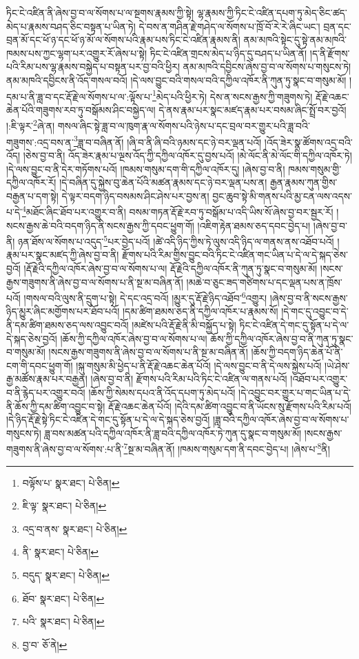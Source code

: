 ཏིང་ངེ་འཛིན་ནི་ཞེས་བྱ་བ་ལ་སོགས་པ་ལ་སྔགས་རྣམས་ཀྱི་སྟེ། ལྷ་རྣམས་ཀྱི་ཏིང་ངེ་འཛིན་དཔག་ཏུ་མེད་ཅིང་ཚད་མེད་པ་རྣམས་བཤད་ཅིང་བསྟན་པ་ཡིན་ཏེ། དེ་བས་ན་གཤིན་རྗེ་གཤེད་ལ་སོགས་པ་ཁྲོ་བོ་རེ་རེ་ཞིང་ཡང་། བྲན་དང་བྲན་མོ་དང་ཕོ་ཉ་དང་ཕོ་ཉ་མོ་ལ་སོགས་པའི་རྣམ་པས་ཏིང་ངེ་འཛིན་རྣམས་ནི། ནམ་མཁའི་སྟེང་དུ་སྟེ་ནམ་མཁའི་ཁམས་པས་ཀྱང་ལྷག་པར་འགྱུར་རོ་ཞེས་པ་སྟེ། ཏིང་ངེ་འཛིན་གྲངས་མེད་པ་ཉིད་དུ་བཤད་པ་ཡིན་ནོ། །ད་ནི་རྫོགས་པའི་རིམ་པས་ལྷ་རྣམས་བསྐྱེད་པ་བསྟན་པར་བྱ་བའི་ཕྱིར། ནམ་མཁའི་དབྱིངས་ཞེས་བྱ་བ་ལ་སོགས་པ་གསུངས་ཏེ། ནམ་མཁའི་དབྱིངས་ནི་འོད་གསལ་བའོ། །དེ་ལས་བྱུང་བའི་གསལ་བའི་དཀྱིལ་འཁོར་ནི་ཀུན་ཏུ་སྣང་བ་གསུམ་མོ། །དམ་པ་ནི་ཟླ་བ་དང་རྡོ་རྗེ་ལ་སོགས་པ་ལ་:ལྟོས་པ་\footnote{བལྟོས་པ་  སྣར་ཐང་།  པེ་ཅིན། }མེད་པའི་ཕྱིར་ཏེ། དེས་ན་སངས་རྒྱས་ཀྱི་གཟུགས་ཏེ། རྡོ་རྗེ་འཆང་ཆེན་པོའི་གཟུགས་རབ་ཏུ་བསྒོམས་ཤིང་བསྐྱེད་ལ། དེ་ནས་རྣམ་པར་སྣང་མཛད་རྣམ་པར་བསམ་ཞིང་སྤྲོ་བར་བྱའོ། །:ཇི་ལྟར་\footnote{ཇི་ལྟ་  སྣར་ཐང་།  པེ་ཅིན། }ཞེ་ན། གསལ་ཞིང་སྟེ་ཟླ་བ་ལ་ཁུག་རྣ་ལ་སོགས་པའི་ཉེས་པ་དང་བྲལ་བར་གྱུར་པའི་ཟླ་བའི་གཟུགས་:འདྲ་བས་ན་\footnote{འདྲ་བ་ནས་  སྣར་ཐང་།  པེ་ཅིན། }ཟླ་བ་བཞིན་ནོ། །ཞི་བ་ནི་ཞི་བའི་ཉམས་དང་ཉེ་བར་ལྡན་པའོ། །འོད་ཟེར་སྣ་ཚོགས་འདྲ་བའི་འོད། །ཅེས་བྱ་བ་ནི། འོད་ཟེར་རྣམ་པ་ལྔས་འོད་ཀྱི་དཀྱིལ་འཁོར་དུ་བྱས་པའོ། །མེ་ལོང་ནི་མེ་ལོང་གི་དཀྱིལ་འཁོར་ཏེ། །དེ་ལས་བྱུང་བ་ནི་དེར་གཏོགས་པའོ། །ཁམས་གསུམ་དག་གི་དཀྱིལ་འཁོར་དུ། །ཞེས་བྱ་བ་ནི། ཁམས་གསུམ་གྱི་དཀྱིལ་འཁོར་རོ། །དེ་བཞིན་དུ་སྐྱེས་བུ་ཆེན་པོའི་མཚན་རྣམས་དང་ཉེ་བར་ལྡན་པས་ན། རྒྱན་རྣམས་ཀུན་གྱིས་བརྒྱན་པ་དག་སྟེ། དེ་ལྟར་བདག་ཉིད་བསམས་ཤིང་ཤེས་པར་བྱས་ན། བྱང་ཆུབ་སྟེ་མི་གནས་པའི་མྱ་ངན་ལས་འདས་པ་དེ་\footnote{ནི་  སྣར་ཐང་།  པེ་ཅིན། }མཐོང་ཞིང་ཐོབ་པར་འགྱུར་བ་ནི། བསམ་གཏན་རྡོ་རྗེ་རབ་ཏུ་བསྒོམ་པ་འདི་ཡིས་སོ་ཞེས་བྱ་བར་སྦྱར་རོ། །སངས་རྒྱས་ཆེ་བའི་བདག་ཉིད་ནི་སངས་རྒྱས་ཀྱི་དབང་ཕྱུག་གོ། །འཇིག་རྟེན་ཐམས་ཅད་དབང་བྱེད་པ། །ཞེས་བྱ་བ་ནི། ཉན་ཐོས་ལ་སོགས་པ་འདུད་\footnote{བདུད་  སྣར་ཐང་།  པེ་ཅིན། }པར་བྱེད་པའོ། །ཚེ་འདི་ཉིད་ཀྱིས་ཏེ་ལུས་འདི་ཉིད་ལ་གནས་ནས་འཐོབ་པའོ། །རྣམ་པར་སྣང་མཛད་ཀྱི་ཞེས་བྱ་བ་ནི། རྫོགས་པའི་རིམ་གྱིས་བྱུང་བའི་ཏིང་ངེ་འཛིན་གང་ཡིན་པ་དེ་ལ་དེ་སྐད་ཅེས་བྱའོ། །རྡོ་རྗེའི་དཀྱིལ་འཁོར་ཞེས་བྱ་བ་ལ་སོགས་པ་ལ། རྡོ་རྗེའི་དཀྱིལ་འཁོར་ནི་ཀུན་ཏུ་སྣང་བ་གསུམ་མོ། །སངས་རྒྱས་གཟུགས་ནི་ཞེས་བྱ་བ་ལ་སོགས་པ་ནི་སྔ་མ་བཞིན་ནོ། །མཆེ་བ་ཅུང་ཟད་གཙིགས་པ་དང་ལྡན་པས་ན་ཁྲོས་པའོ། །གསལ་བའི་ལུས་ནི་དྲུག་པ་སྟེ། དེ་དང་འདྲ་བའོ། །མྱུར་དུ་རྡོ་རྗེ་ཉིད་འཐོབ་\footnote{ཐོབ་  སྣར་ཐང་།  པེ་ཅིན། }འགྱུར། །ཞེས་བྱ་བ་ནི་སངས་རྒྱས་ཉིད་མྱུར་ཞིང་མགྱོགས་པར་ཐོབ་པའོ། །དམ་ཚིག་ཐམས་ཅད་ནི་དཀྱིལ་འཁོར་པ་རྣམས་སོ། །དེ་གང་དུ་འབྱུང་བ་དེ་ནི་དམ་ཚིག་ཐམས་ཅད་ལས་འབྱུང་བའོ། །མཛེས་པའི་རྡོ་རྗེ་ནི་མི་བསྐྱོད་པ་སྟེ། ཏིང་ངེ་འཛིན་དེ་གང་དུ་སྟོན་པ་དེ་ལ་དེ་སྐད་ཅེས་བྱའོ། །ཆོས་ཀྱི་དཀྱིལ་འཁོར་ཞེས་བྱ་བ་ལ་སོགས་པ་ལ། ཆོས་ཀྱི་དཀྱིལ་འཁོར་ཞེས་བྱ་བ་ནི་ཀུན་ཏུ་སྣང་བ་གསུམ་མོ། །སངས་རྒྱས་གཟུགས་ནི་ཞེས་བྱ་བ་ལ་སོགས་པ་ནི་སྔ་མ་བཞིན་ནོ། །ཆོས་ཀྱི་བདག་ཉིད་ཆེན་པོ་ནི་ངག་གི་དབང་ཕྱུག་གོ། །སྐུ་གསུམ་མི་ཕྱེད་པ་ནི་རྡོ་རྗེ་འཆང་ཆེན་པོའོ། །དེ་ལས་བྱུང་བ་ནི་དེ་ལས་སྐྱེས་པའོ། །ཡེ་ཤེས་རྒྱ་མཚོས་རྣམ་པར་བརྒྱན། །ཞེས་བྱ་བ་ནི། རྫོགས་པའི་རིམ་པའི་ཏིང་ངེ་འཛིན་ལ་གནས་པའོ། །འཐོབ་པར་འགྱུར་བ་ནི་རྙེད་པར་འགྱུར་བའོ། །ཆོས་ཀྱི་སེམས་དཔའ་ནི་འོད་དཔག་ཏུ་མེད་པའོ། །དེ་འབྱུང་བར་གྱུར་པ་གང་ཡིན་པ་དེ་ནི་ཆོས་ཀྱི་དམ་ཚིག་འབྱུང་བ་སྟེ། རྡོ་རྗེ་འཆང་ཆེན་པོའོ། །དེའི་དམ་ཚིག་འབྱུང་བ་ནི་ཡོངས་སུ་རྫོགས་པའི་རིམ་པའོ། །དེ་ཉིད་རྡོ་རྗེ་སྟེ་ཏིང་ངེ་འཛིན་དེ་གང་དུ་སྟོན་པ་དེ་ལ་དེ་སྐད་ཅེས་བྱའོ། །ཟླ་བའི་དཀྱིལ་འཁོར་ཞེས་བྱ་བ་ལ་སོགས་པ་གསུངས་ཏེ། ཟླ་བས་མཚན་པའི་དཀྱིལ་འཁོར་ནི་ཟླ་བའི་དཀྱིལ་འཁོར་ཏེ་ཀུན་དུ་སྣང་བ་གསུམ་མོ། །སངས་རྒྱས་གཟུགས་ནི་ཞེས་བྱ་བ་ལ་སོགས་:པ་ནི་\footnote{པའི་  སྣར་ཐང་།  པེ་ཅིན། }སྔ་མ་བཞིན་ནོ། །ཁམས་གསུམ་དག་ནི་དབང་བྱེད་པ། །ཞེས་པ་\footnote{བྱ་བ་  ཅོ་ནེ། }ནི། 